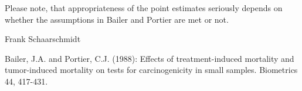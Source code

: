 \begin{Note}\relax
Please note, that appropriateness of the point estimates seriously depends on whether the assumptions in Bailer and Portier are met or not.
\end{Note}
\begin{Author}\relax
Frank Schaarschmidt
\end{Author}
\begin{References}\relax
Bailer, J.A. and Portier, C.J. (1988):
Effects of treatment-induced mortality and tumor-induced mortality on tests for carcinogenicity in small samples.
Biometrics 44, 417-431.
\end{References}

